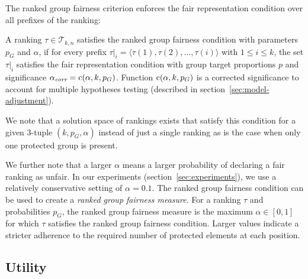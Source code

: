 The ranked group fairness criterion enforces the fair representation condition over all prefixes of the ranking:

\begin{definition}
	\label{def:ranked-group-fairness-condition}
	A ranking $\tau \in {\mathcal T}_{k,n}$ satisfies the ranked group fairness condition with parameters $p_G$ and $\alpha$, if for every prefix $\tau|_i = \langle \tau(1), \tau(2), \dots, \tau(i) \rangle$ with $1 \le i \le k$, the set $\tau|_i$ satisfies the fair representation condition with group target proportions $p$ and significance $\alpha_\textit{corr} = \operatorname{c}(\alpha, k, p_G)$.
	Function $\operatorname{c}(\alpha, k, p_G)$ is a corrected significance to account for multiple hypotheses testing (described in section~\ref{sec:model-adjustment}).
\end{definition}

We note that a solution space of rankings exists that satisfy this condition for a given 3-tuple $(k, p_G, \alpha)$ instead of just a single ranking as is the case when only one protected group is present.

We further note that a larger $\alpha$ means a larger probability of declaring a fair ranking as unfair.
%
In our experiments (section~\ref{sec:experiments}), we use a relatively conservative setting of $\alpha=0.1$.
%
The ranked group fairness condition can be used to create a \emph{ranked group fairness measure}. For a ranking $\tau$ and probabilities $p_G$, the ranked group fairness measure is the maximum $\alpha \in [0,1]$ for which $\tau$ satisfies the ranked group fairness condition.
%
Larger values indicate a stricter adherence to the required number of protected elements at each position.

\subsection{Utility}
\label{subsec:individual-fairness}

